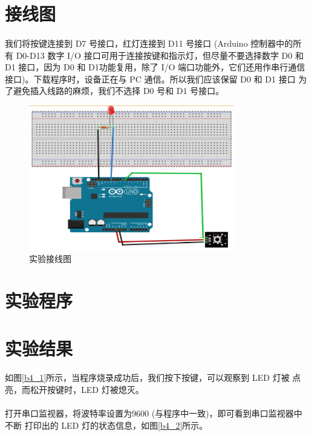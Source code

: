 \documentclass[UTF8, oneside]{ctexbook}
\begin{document}
\section{接线图}
\paragraph{}
我们将按键连接到 D7 号接口，红灯连接到 D11 号接口 (Arduino 控制器中的所有 D0-D13 数字 I/O 
接口可用于连接按键和指示灯，但尽量不要选择数字 D0 和 D1 接口，因为 D0 和 D1功能复用，除了 
I/O 端口功能外，它们还用作串行通信接口)。下载程序时，设备正在与 PC 通信。所以我们应该保留
D0 和 D1 接口 为了避免插入线路的麻烦，我们不选择 D0 号和 D1 号接口。
\begin{figure}[h]
    \centering
    \includegraphics[width=0.8\textwidth]{./result/basic/4/lines.png}
    \caption{实验接线图}
    \label{b4_line}
\end{figure}

\section{实验程序}


\section{实验结果}
\paragraph{}
如图\ref{b4_1}所示，当程序烧录成功后，我们按下按键，可以观察到 LED 灯被
点亮，而松开按键时，LED 灯被熄灭。

\paragraph{}
打开串口监视器，将波特率设置为9600 (与程序中一致)，即可看到串口监视器中不断
打印出的 LED 灯的状态信息，如图\ref{b4_2}所示。
\newpage
\end{document}
